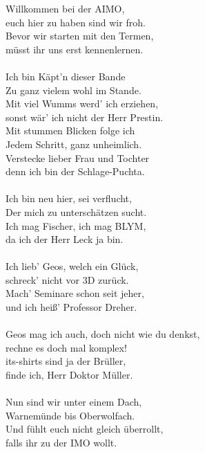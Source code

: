 \documentclass[oneside]{memoir}
\begin{document}
\newpage
\thispagestyle{plain}
\begin{singlespace}
Willkommen bei der AIMO, \\
euch hier zu haben sind wir froh. \\
Bevor wir starten mit den Termen, \\
müsst ihr uns erst kennenlernen. \\  \\

Ich bin Käpt'n dieser Bande \\
Zu ganz vielem wohl im Stande. \\
Mit viel Wumms werd' ich erziehen, \\
sonst wär' ich nicht der Herr Prestin. \\

Mit stummen Blicken folge ich \\
Jedem Schritt, ganz unheimlich. \\
Verstecke lieber Frau und Tochter \\
denn ich bin der Schlage-Puchta. \\ \\

Ich bin neu hier, sei verflucht, \\
Der mich zu unterschätzen sucht. \\
Ich mag Fischer, ich mag BLYM, \\
 da ich der Herr Leck ja bin. \\ \\

Ich lieb' Geos, welch ein Glück, \\
schreck' nicht vor 3D zurück. \\
Mach' Seminare schon seit jeher, \\
und ich heiß' Professor Dreher. \\ \\

Geos mag ich auch, doch nicht wie du denkst, \\
rechne es doch mal komplex! \\
its-shirts sind ja der Brüller, \\
finde ich, Herr Doktor Müller. \\ \\

Nun sind wir unter einem Dach, \\
Warnemünde bis Oberwolfach. \\
Und fühlt euch nicht gleich überrollt, \\
falls ihr zu der IMO wollt.
\end{singlespace}
\onehalfspacing
\end{document}
